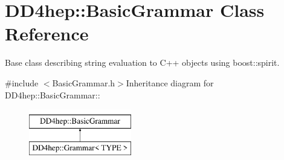 \hypertarget{class_d_d4hep_1_1_basic_grammar}{
\section{DD4hep::BasicGrammar Class Reference}
\label{class_d_d4hep_1_1_basic_grammar}
}


Base class describing string evaluation to C++ objects using boost::spirit.  


{\ttfamily \#include $<$BasicGrammar.h$>$}Inheritance diagram for DD4hep::BasicGrammar::\begin{figure}[H]
\begin{center}
\leavevmode
\includegraphics[height=2cm]{class_d_d4hep_1_1_basic_grammar}
\end{center}
\end{figure}
